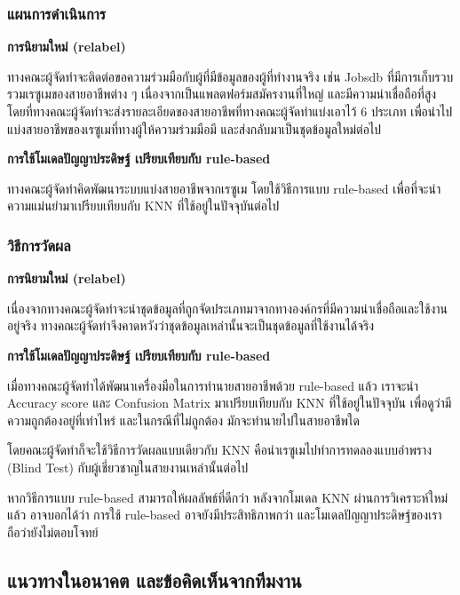 \subsubsection{แผนการดำเนินการ}
\textbf{การนิยามใหม่ (relabel)}

\par{
    ทางคณะผู้จัดทำจะติดต่อขอความร่วมมือกับผู้ที่มีข้อมูลของผู้ที่ทำงานจริง เช่น Jobsdb ที่มีการเก็บรวบรวมเรซูเมของสายอาชีพต่าง ๆ เนื่องจากเป็นแพลตฟอร์มสมัครงานที่ใหญ่ และมีความน่าเชื่อถือที่สูง โดยที่ทางคณะผู้จัดทำจะส่งรายละเอียดของสายอาชีพที่ทางคณะผู้จัดทำแบ่งเอาไว้ 6 ประเภท เพื่อนำไปแบ่งสายอาชีพของเรซูเมที่ทางผู้ให้ความร่วมมือมี และส่งกลับมาเป็นชุดข้อมูลใหม่ต่อไป
}

\textbf{การใช้โมเดลปัญญาประดิษฐ์ เปรียบเทียบกับ rule-based}

\par{
    ทางคณะผู้จัดทำคิดพัฒนาระบบแบ่งสายอาชีพจากเรซูเม โดยใช้วิธีการแบบ rule-based เพื่อที่จะนำความแม่นยำมาเปรียบเทียบกับ KNN ที่ใช้อยู่ในปัจจุบันต่อไป 
}

\subsubsection{วิธีการวัดผล}
\textbf{การนิยามใหม่ (relabel)}

\par{
    เนื่องจากทางคณะผู้จัดทำจะนำชุดข้อมูลที่ถูกจัดประเภทมาจากทางองค์กรที่มีความน่าเชื่อถือและใช้งานอยู่จริง ทางคณะผู้จัดทำจึงคาดหวังว่าชุดข้อมูลเหล่านั้นจะเป็นชุดข้อมูลที่ใช้งานได้จริง
}

\textbf{การใช้โมเดลปัญญาประดิษฐ์ เปรียบเทียบกับ rule-based}

\par{
    เมื่อทางคณะผู้จัดทำได้พัฒนาเครื่องมือในการทำนายสายอาชีพด้วย rule-based แล้ว เราจะนำ Accuracy score และ Confusion Matrix มาเปรียบเทียบกับ KNN ที่ใช้อยู่ในปัจจุบัน เพื่อดูว่ามีความถูกต้องอยู่ที่เท่าไหร่ และในกรณีที่ไม่ถูกต้อง มักจะทำนายไปในสายอาชีพใด
}

\par{
    โดยคณะผู้จัดทำก็จะใช้วิธีการวัดผลแบบเดียวกับ KNN คือนำเรซูเมไปทำการทดลองแบบอำพราง (Blind Test) กับผู้เชี่ยวชาญในสายงานเหล่านั้นต่อไป
}

\par{
    หากวิธีการแบบ rule-based สามารถให้ผลลัพธ์ที่ดีกว่า หลังจากโมเดล KNN ผ่านการวิเคราะห์ใหม่แล้ว อาจบอกได้ว่า การใช้ rule-based อาจยังมีประสิทธิภาพกว่า และโมเดลปัญญาประดิษฐ์ของเราถือว่ายังไม่ตอบโจทย์
}

\subsection{แนวทางในอนาคต และข้อคิดเห็นจากทีมงาน}

